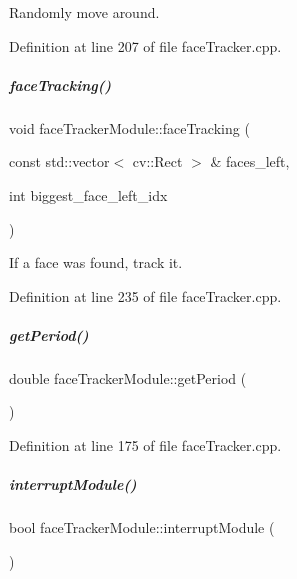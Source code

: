 Randomly move around. 



Definition at line 207 of file face\+Tracker.\+cpp.

\mbox{\label{group__faceTracker_ae67c3501ac32d99ccf5cd53596472a1b}} 
\subparagraph{\texorpdfstring{face\+Tracking()}{faceTracking()}}
{\footnotesize\ttfamily void face\+Tracker\+Module\+::face\+Tracking (\begin{DoxyParamCaption}\item[{const std\+::vector$<$ cv\+::\+Rect $>$ \&}]{faces\+\_\+left,  }\item[{int}]{biggest\+\_\+face\+\_\+left\+\_\+idx }\end{DoxyParamCaption})\hspace{0.3cm}{\ttfamily [protected]}}



If a face was found, track it. 



Definition at line 235 of file face\+Tracker.\+cpp.

\mbox{\label{group__faceTracker_a249d0a6adc301a5a1637da1eb79a29c9}} 
\subparagraph{\texorpdfstring{get\+Period()}{getPeriod()}}
{\footnotesize\ttfamily double face\+Tracker\+Module\+::get\+Period (\begin{DoxyParamCaption}{ }\end{DoxyParamCaption})}



Definition at line 175 of file face\+Tracker.\+cpp.

\mbox{\label{group__faceTracker_ac025eb44b288916aa000917be21d4cb1}} 
\subparagraph{\texorpdfstring{interrupt\+Module()}{interruptModule()}}
{\footnotesize\ttfamily bool face\+Tracker\+Module\+::interrupt\+Module (\begin{DoxyParamCaption}{ }\end{DoxyParamCaption})}



